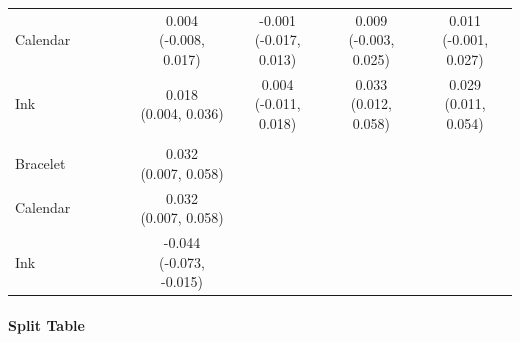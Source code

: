 \documentclass[
]{article}
\begin{document}
\begin{table}
{\begin{tabular}[t]{lcccccccc}
\addlinespace \addlinespace \hspace{1em}Calendar &  &  &  &  & \makecell[c]{0.004\\(-0.008, 0.017)} & \makecell[c]{-0.001\\(-0.017, 0.013)} & \makecell[c]{0.009\\(-0.003, 0.025)} & \makecell[c]{0.011\\(-0.001, 0.027)}\\
\addlinespace \addlinespace \hspace{1em}Ink &  &  &  &  & \makecell[c]{0.018\\(0.004, 0.036)} & \makecell[c]{0.004\\(-0.011, 0.018)} & \makecell[c]{0.033\\(0.012, 0.058)} & \makecell[c]{0.029\\(0.011, 0.054)}\\
\addlinespace \addlinespace \addlinespace[0.3em]
\hline
\multicolumn{9}{l}{\textit{\textbf{Panel C: Private}}}\\
\hline
\hspace{1em}Bracelet &  &  &  &  & \makecell[c]{0.032\\(0.007, 0.058)} &  &  & \\
\addlinespace \addlinespace \hspace{1em}Calendar &  &  &  &  & \makecell[c]{0.032\\(0.007, 0.058)} &  &  & \\
\addlinespace \addlinespace \hspace{1em}Ink &  &  &  &  & \makecell[c]{-0.044\\(-0.073, -0.015)} &  &  & \\
\bottomrule
\end{tabular}}
\end{table}

\paragraph{Split Table}\label{split-table}
\end{document}
